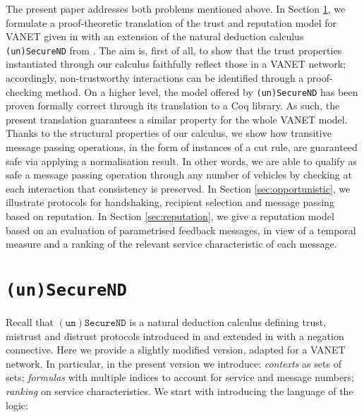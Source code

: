 \documentclass[compsoc, conference, letterpaper, 10pt, times]{IEEEtran}
\begin{document}
The present paper addresses both problems mentioned above. In Section \ref{sec:logic}, we formulate a proof-theoretic translation of the trust and reputation model for VANET given in \cite{glenford} with an extension of the natural deduction calculus \texttt{(un)SecureND} from \cite{DBLP:conf/ifiptm/Primiero16}. The aim is, first of all, to show that the trust properties instantiated through our calculus faithfully reflect those in a VANET network; accordingly, non-trustworthy interactions can be identified through a proof-checking method. On a higher level, the model offered by \texttt{(un)SecureND} has been proven formally correct through its translation to a Coq library. As such, the present translation guarantees a similar property for the whole VANET model. Thanks to the structural properties of our calculus, we show how transitive message passing operations, in the form of instances of a cut rule, are guaranteed safe via applying a normalisation result. In other words, we are able to qualify as safe a message passing operation through any number of vehicles by checking at each interaction that consistency is preserved. In Section \ref{sec:opportunistic}, we illustrate protocols for handshaking, recipient selection and message passing based on reputation. In Section \ref{sec:reputation}, we give a reputation model based on an evaluation of parametrised feedback messages, in view of a temporal measure and a ranking of the relevant service characteristic of each message.




\section{\texttt{(un)SecureND}}\label{sec:logic}

Recall that $\mathtt{(un)SecureND}$ is a natural deduction calculus defining trust, mistrust and distrust protocols introduced in \cite{primiero_secureND} and extended in \cite{DBLP:conf/ifiptm/Primiero16} with a negation connective. Here we provide a slightly modified version, adapted for a VANET network. In particular, in the present version we introduce: \emph{contexts} as sets of sets; \emph{formulas} with multiple indices to account for service and message numbers; \emph{ranking} on service characteristics. We start with introducing the language of the logic:
\end{document}
